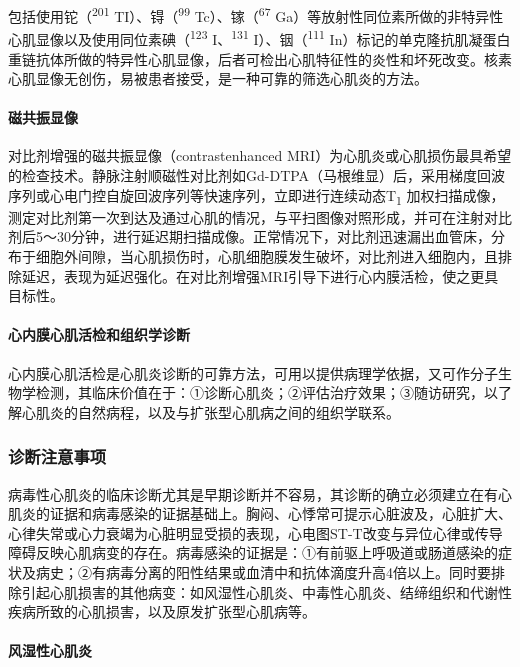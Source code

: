 包括使用铊（\textsuperscript{201} TI）、锝（\textsuperscript{99}
Tc）、镓（\textsuperscript{67}
Ga）等放射性同位素所做的非特异性心肌显像以及使用同位素碘（\textsuperscript{123}
I、\textsuperscript{131} I）、铟（\textsuperscript{111}
In）标记的单克隆抗肌凝蛋白重链抗体所做的特异性心肌显像，后者可检出心肌特征性的炎性和坏死改变。核素心肌显像无创伤，易被患者接受，是一种可靠的筛选心肌炎的方法。

\paragraph{磁共振显像}

对比剂增强的磁共振显像（contrastenhanced
MRI）为心肌炎或心肌损伤最具希望的检查技术。静脉注射顺磁性对比剂如Gd-DTPA（马根维显）后，采用梯度回波序列或心电门控自旋回波序列等快速序列，立即进行连续动态T\textsubscript{1}
加权扫描成像，测定对比剂第一次到达及通过心肌的情况，与平扫图像对照形成，并可在注射对比剂后5～30分钟，进行延迟期扫描成像。正常情况下，对比剂迅速漏出血管床，分布于细胞外间隙，当心肌损伤时，心肌细胞膜发生破坏，对比剂进入细胞内，且排除延迟，表现为延迟强化。在对比剂增强MRI引导下进行心内膜活检，使之更具目标性。

\paragraph{心内膜心肌活检和组织学诊断}

心内膜心肌活检是心肌炎诊断的可靠方法，可用以提供病理学依据，又可作分子生物学检测，其临床价值在于：①诊断心肌炎；②评估治疗效果；③随访研究，以了解心肌炎的自然病程，以及与扩张型心肌病之间的组织学联系。

\subsubsection{诊断注意事项}

病毒性心肌炎的临床诊断尤其是早期诊断并不容易，其诊断的确立必须建立在有心肌炎的证据和病毒感染的证据基础上。胸闷、心悸常可提示心脏波及，心脏扩大、心律失常或心力衰竭为心脏明显受损的表现，心电图ST-T改变与异位心律或传导障碍反映心肌病变的存在。病毒感染的证据是：①有前驱上呼吸道或肠道感染的症状及病史；②有病毒分离的阳性结果或血清中和抗体滴度升高4倍以上。同时要排除引起心肌损害的其他病变：如风湿性心肌炎、中毒性心肌炎、结缔组织和代谢性疾病所致的心肌损害，以及原发扩张型心肌病等。

\paragraph{风湿性心肌炎}

